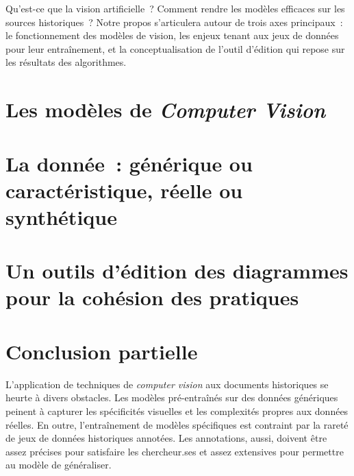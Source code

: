 \documentclass[a4paper,12pt,twoside]{book}
\newcommand{\cv}{\emph{computer vision}\xspace}
\newcommand{\clearemptydoublepage}{\newpage{\pagestyle{empty}\cleardoublepage}}
\begin{document}
Qu'est-ce que la vision artificielle~? Comment rendre les modèles
efficaces sur les sources historiques~? Notre propos s'articulera autour
de trois axes principaux~: le fonctionnement des modèles de vision, les
enjeux tenant aux jeux de données pour leur entraînement, et la
conceptualisation de l'outil d'édition qui repose sur les résultats des
algorithmes.

\clearemptydoublepage
    
        \hypertarget{chapitre-4-modele}{%
        \chapter{Les modèles de \emph{Computer Vision}}\label{chapitre-4-modele}}

            
               
            
        \clearemptydoublepage

\hypertarget{chapitre-5-la-donnee}{%
\chapter{La donnée~: générique ou caractéristique, réelle
ou
synthétique}\label{chapitre-5-la-donnee}}

            
            
        \clearemptydoublepage
        
\hypertarget{chapitre-6-vers-edition}{%
\chapter{Un outils d'édition des diagrammes pour la cohésion des pratiques}\label{chapitre-6-vers-edition}}

            
            
        \clearemptydoublepage

        \chapter*{Conclusion partielle}

L'application de techniques de \cv aux documents historiques
se heurte à divers obstacles. Les modèles pré-entraînés sur des données
génériques peinent à capturer les spécificités visuelles et les
complexités propres aux données réelles. En outre, l'entraînement de modèles
spécifiques est contraint par la rareté de jeux de données historiques
annotées. Les annotations, aussi, doivent être assez précises pour
satisfaire les chercheur.ses et assez extensives pour permettre au modèle de
généraliser.
\end{document}
